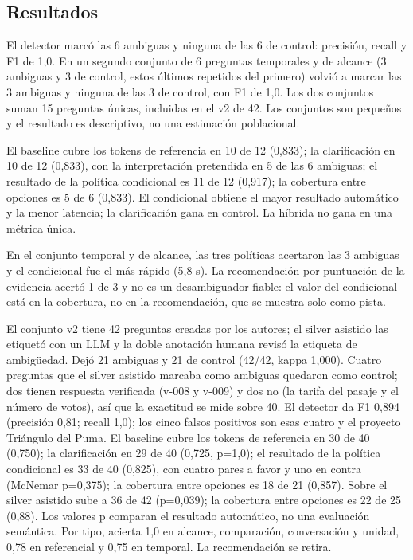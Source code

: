 \subsection{Resultados}

El detector marc\'o las 6 ambiguas y ninguna de las 6 de control: precisi\'on, recall y F1 de 1,0. En un segundo conjunto de 6 preguntas temporales y de alcance (3 ambiguas y 3 de control, estos \'ultimos repetidos del primero) volvi\'o a marcar las 3 ambiguas y ninguna de las 3 de control, con F1 de 1,0. Los dos conjuntos suman 15 preguntas \'unicas, incluidas en el v2 de 42. Los conjuntos son peque\~nos y el resultado es descriptivo, no una estimaci\'on poblacional.

El baseline cubre los tokens de referencia en 10 de 12 (0,833); la clarificaci\'on en 10 de 12 (0,833), con la interpretaci\'on pretendida en 5 de las 6 ambiguas; el resultado de la pol\'itica condicional es 11 de 12 (0,917); la cobertura entre opciones es 5 de 6 (0,833). El condicional obtiene el mayor resultado autom\'atico y la menor latencia; la clarificaci\'on gana en control. La h\'ibrida no gana en una m\'etrica \'unica.

En el conjunto temporal y de alcance, las tres pol\'iticas acertaron las 3 ambiguas y el condicional fue el m\'as r\'apido (5,8 s). La recomendaci\'on por puntuaci\'on de la evidencia acert\'o 1 de 3 y no es un desambiguador fiable: el valor del condicional est\'a en la cobertura, no en la recomendaci\'on, que se muestra solo como pista.

El conjunto v2 tiene 42 preguntas creadas por los autores; el silver asistido las etiquet\'o con un LLM y la doble anotaci\'on humana revis\'o la etiqueta de ambig\"uedad. Dej\'o 21 ambiguas y 21 de control (42/42, kappa 1,000). Cuatro preguntas que el silver asistido marcaba como ambiguas quedaron como control; dos tienen respuesta verificada (v-008 y v-009) y dos no (la tarifa del pasaje y el n\'umero de votos), as\'i que la exactitud se mide sobre 40. El detector da F1 0,894 (precisi\'on 0,81; recall 1,0); los cinco falsos positivos son esas cuatro y el proyecto Tri\'angulo del Puma. El baseline cubre los tokens de referencia en 30 de 40 (0,750); la clarificaci\'on en 29 de 40 (0,725, p=1,0); el resultado de la pol\'itica condicional es 33 de 40 (0,825), con cuatro pares a favor y uno en contra (McNemar p=0,375); la cobertura entre opciones es 18 de 21 (0,857). Sobre el silver asistido sube a 36 de 42 (p=0,039); la cobertura entre opciones es 22 de 25 (0,88). Los valores p comparan el resultado autom\'atico, no una evaluaci\'on sem\'antica. Por tipo, acierta 1,0 en alcance, comparaci\'on, conversaci\'on y unidad, 0,78 en referencial y 0,75 en temporal. La recomendaci\'on se retira.

